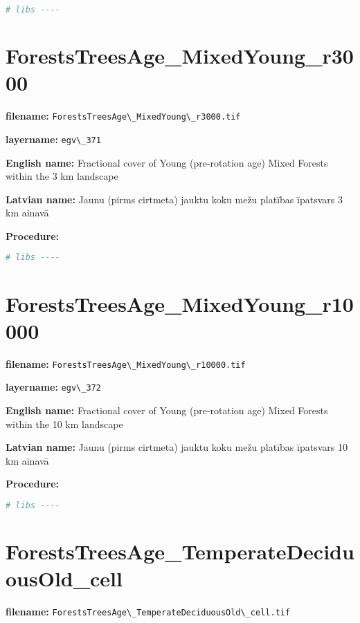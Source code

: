 \documentclass[
]{book}
\newcommand{\passthrough}[1]{#1}
\begin{document}
\begin{lstlisting}[language=R]
# libs ----
\end{lstlisting}

\section{ForestsTreesAge\_MixedYoung\_r3000}\label{ch06.371}

\textbf{filename:} \passthrough{\lstinline!ForestsTreesAge\_MixedYoung\_r3000.tif!}

\textbf{layername:} \passthrough{\lstinline!egv\_371!}

\textbf{English name:} Fractional cover of Young (pre-rotation age) Mixed Forests within the 3 km landscape

\textbf{Latvian name:} Jaunu (pirms cirtmeta) jauktu koku mežu platības īpatsvars 3 km ainavā

\textbf{Procedure:}

\begin{lstlisting}[language=R]
# libs ----
\end{lstlisting}

\section{ForestsTreesAge\_MixedYoung\_r10000}\label{ch06.372}

\textbf{filename:} \passthrough{\lstinline!ForestsTreesAge\_MixedYoung\_r10000.tif!}

\textbf{layername:} \passthrough{\lstinline!egv\_372!}

\textbf{English name:} Fractional cover of Young (pre-rotation age) Mixed Forests within the 10 km landscape

\textbf{Latvian name:} Jaunu (pirms cirtmeta) jauktu koku mežu platības īpatsvars 10 km ainavā

\textbf{Procedure:}

\begin{lstlisting}[language=R]
# libs ----
\end{lstlisting}

\section{ForestsTreesAge\_TemperateDeciduousOld\_cell}\label{ch06.373}

\textbf{filename:} \passthrough{\lstinline!ForestsTreesAge\_TemperateDeciduousOld\_cell.tif!}
\end{document}
